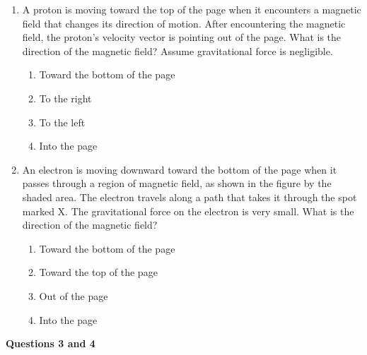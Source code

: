 \documentclass[11pt]{article}
\begin{document}
\raggedcolumns
\begin{multicols}{2}

  \begin{enumerate}[leftmargin=18pt]
  \item A proton is moving toward the top of the page when it encounters a
    magnetic field that changes its direction of motion. After encountering
    the magnetic field, the proton's velocity vector is pointing out of the
    page. What is the direction of the magnetic field? Assume gravitational
    force is negligible.
    \begin{enumerate}[noitemsep,topsep=0pt,leftmargin=18pt,label=(\Alph*)]
    \item Toward the bottom of the page
    \item To the right
    \item To the left
    \item Into the page
    \end{enumerate}

  \item An electron is moving downward toward the bottom of the page when it
    passes through a region of magnetic field, as shown in the figure by the
    shaded area. The electron travels along a path that takes it through the
    spot marked X. The gravitational force on the electron is very small. What
    is the direction of the magnetic field?

    \begin{center}
    \end{center}
    \begin{enumerate}[noitemsep,topsep=0pt,leftmargin=18pt,label=(\Alph*)]
    \item Toward the bottom of the page
    \item Toward the top of the page
    \item Out of the page
    \item Into the page
    \end{enumerate}
  \end{enumerate}

  \columnbreak

  \textbf{Questions 3 and 4}


\end{multicols}
\end{document}
